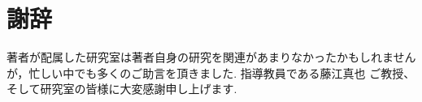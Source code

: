 \chapter{謝辞}
  \label{chap:acknowledgments}
  著者が配属した研究室は著者自身の研究を関連があまりなかったかもしれませんが，忙しい中でも多くのご助言を頂きました. 指導教員である藤江真也 ご教授、そして研究室の皆様に大変感謝申し上げます.
